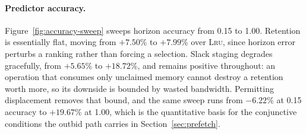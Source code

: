 \paragraph{Predictor accuracy.}
Figure~\ref{fig:accuracy-sweep} sweeps horizon accuracy from 0.15 to 1.00.
Retention is essentially flat, moving from $+7.50$\% to $+7.99$\% over
\textsc{Lru}, since horizon error perturbs a ranking rather than forcing a
selection. Slack staging degrades gracefully, from $+5.65$\% to $+18.72$\%,
and remains positive throughout: an operation that consumes only unclaimed
memory cannot destroy a retention worth more, so its downside is bounded by
wasted bandwidth. Permitting displacement removes that bound, and the same
sweep runs from $-6.22$\% at 0.15 accuracy to $+19.67$\% at 1.00, which is the
quantitative basis for the conjunctive conditions the outbid path carries in
Section~\ref{sec:prefetch}.


